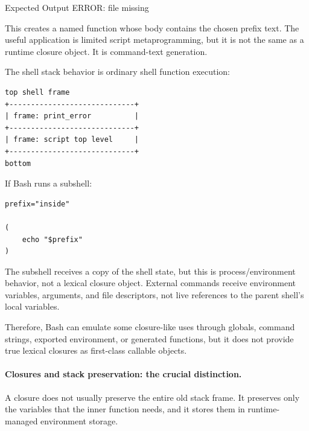 \documentclass[a4paper,twoside]{report}
\begin{document}


\begin{iobox}{Expected Output}
ERROR: file missing \\
\end{iobox}



This creates a named function whose body contains the chosen prefix text. The useful application is limited script metaprogramming, but it is not the same as a runtime closure object. It is command-text generation.

The shell stack behavior is ordinary shell function execution:

\begin{verbatim}
top shell frame
+-----------------------------+
| frame: print_error          |
+-----------------------------+
| frame: script top level     |
+-----------------------------+
bottom
\end{verbatim}

If Bash runs a subshell:

\begin{verbatim}
prefix="inside"

(
    echo "$prefix"
)
\end{verbatim}

The subshell receives a copy of the shell state, but this is process/environment behavior, not a lexical closure object. External commands receive environment variables, arguments, and file descriptors, not live references to the parent shell's local variables.

Therefore, Bash can emulate some closure-like uses through globals, command strings, exported environment, or generated functions, but it does not provide true lexical closures as first-class callable objects.

\paragraph{Closures and stack preservation: the crucial distinction.}

A closure does not usually preserve the entire old stack frame. It preserves only the variables that the inner function needs, and it stores them in runtime-managed environment storage.
\end{document}
